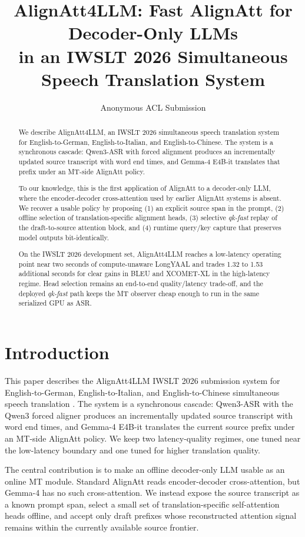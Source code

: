 \documentclass[11pt]{article}
\title{AlignAtt4LLM: Fast AlignAtt for Decoder-Only LLMs \\ in an IWSLT 2026 Simultaneous Speech Translation System}
\author{Anonymous ACL Submission}
\def\AAName{AlignAtt4LLM}
\begin{document}
\maketitle

\begin{abstract}
We describe \AAName{}, an IWSLT 2026 simultaneous speech translation system
for English-to-German, English-to-Italian, and English-to-Chinese. The system
is a synchronous cascade: Qwen3-ASR with forced alignment produces an
incrementally updated source transcript with word end times, and Gemma-4 E4B-it
translates that prefix under an MT-side AlignAtt policy.

To our knowledge, this is the first application of AlignAtt to a decoder-only
LLM, where the encoder-decoder cross-attention used by earlier AlignAtt
systems is absent. We recover a usable policy by proposing (1) an explicit source
span in the prompt, (2) offline selection of translation-specific
alignment heads, (3) selective \emph{qk-fast} replay of the draft-to-source
attention block, and (4) runtime query/key capture that preserves
model outputs bit-identically.

On the IWSLT 2026 development set, \AAName{} reaches a low-latency operating
point near two seconds of compute-unaware LongYAAL and trades 1.32 to 1.53
additional seconds for clear gains in BLEU and XCOMET-XL in the high-latency
regime. Head selection remains an end-to-end quality/latency trade-off, and
the deployed \emph{qk-fast} path keeps the MT observer cheap enough to run in
the same serialized GPU as ASR.
\end{abstract}

\section{Introduction}
\label{sec:intro}

This paper describes the \AAName{} IWSLT 2026 submission system for
English-to-German, English-to-Italian, and English-to-Chinese simultaneous
speech translation \citep{anastasopoulos-etal-2026-findings}. The system is a
synchronous cascade: Qwen3-ASR with the
Qwen3 forced aligner \citep{qwen3asr26} produces an incrementally updated
source transcript with word end times, and Gemma-4 E4B-it \citep{gemma4card26}
translates the current source prefix under an MT-side AlignAtt policy. We keep
two latency-quality regimes, one tuned near the low-latency boundary and one
tuned for higher translation quality.

The central contribution is to make an offline decoder-only LLM usable as an
online MT module. Standard AlignAtt reads encoder-decoder cross-attention, but
Gemma-4 has no such cross-attention. We instead expose the source transcript as
a known prompt span, select a small set of translation-specific self-attention
heads offline, and accept only draft prefixes whose reconstructed attention
signal remains within the currently available source frontier.
\end{document}
